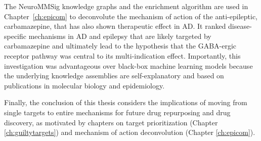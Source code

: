 The NeuroMMSig knowledge graphs and the enrichment algorithm are used in Chapter~\ref{ch:epicom} to deconvolute the mechanism of action of the anti-epileptic, carbamazepine, that has also shown therapeutic effect in \ac{AD}.
It ranked disease-specific mechanisms in \ac{AD} and epilepsy that are likely targeted by carbamazepine and ultimately lead to the hypothesis that the GABA-ergic receptor pathway was central to its multi-indication effect.
Importantly, this investigation was advantageous over black-box machine learning models because the underlying knowledge assemblies are self-explanatory and based on publications in molecular biology and epidemiology.

Finally, the conclusion of this thesis considers the implications of moving from single targets to entire mechanisms for future drug repurposing and drug discovery, as motivated by chapters on target prioritization (Chapter \ref{ch:guiltytargets}) and mechanism of action deconvolution (Chapter \ref{ch:epicom}).
